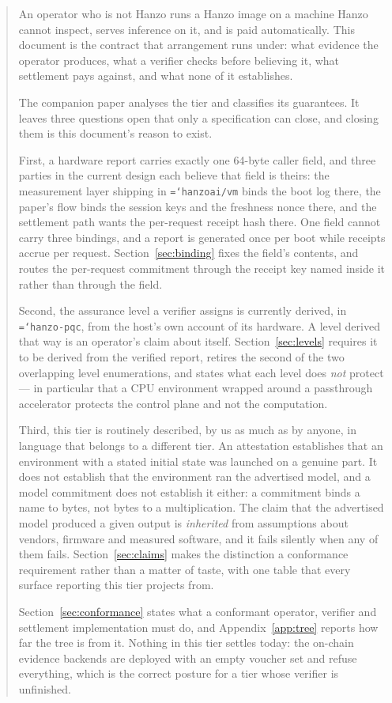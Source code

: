 \documentclass[11pt,a4paper]{article}
\newcommand{\code}[1]{\texttt{\hyphenchar\font=`\-\relax #1}}
\begin{document}
\begin{abstract}
\noindent
An operator who is not Hanzo runs a Hanzo image on a machine Hanzo cannot
inspect, serves inference on it, and is paid automatically. This document is the
contract that arrangement runs under: what evidence the operator produces, what a
verifier checks before believing it, what settlement pays against, and what none
of it establishes.

The companion paper \cite{paper} analyses the tier and classifies its guarantees.
It leaves three questions open that only a specification can close, and closing
them is this document's reason to exist.

First, a hardware report carries exactly one 64-byte caller field, and three
parties in the current design each believe that field is theirs: the measurement
layer shipping in \code{hanzoai/vm} binds the boot log there, the paper's flow
binds the session keys and the freshness nonce there, and the settlement path
wants the per-request receipt hash there. One field cannot carry three bindings,
and a report is generated once per boot while receipts accrue per request.
Section~\ref{sec:binding} fixes the field's contents, and routes the per-request
commitment through the receipt key named inside it rather than through the field.

Second, the assurance level a verifier assigns is currently derived, in
\code{hanzo-pqc}, from the host's own account of its hardware. A level derived
that way is an operator's claim about itself. Section~\ref{sec:levels} requires it
to be derived from the verified report, retires the second of the two overlapping
level enumerations, and states what each level does \emph{not} protect --- in
particular that a CPU environment wrapped around a passthrough accelerator
protects the control plane and not the computation.

Third, this tier is routinely described, by us as much as by anyone, in language
that belongs to a different tier. An attestation establishes that an environment
with a stated initial state was launched on a genuine part. It does not establish
that the environment ran the advertised model, and a model commitment does not
establish it either: a commitment binds a name to bytes, not bytes to a
multiplication. The claim that the advertised model produced a given output is
\emph{inherited} from assumptions about vendors, firmware and measured software,
and it fails silently when any of them fails. Section~\ref{sec:claims} makes the
distinction a conformance requirement rather than a matter of taste, with one
table that every surface reporting this tier projects from.

Section~\ref{sec:conformance} states what a conformant operator, verifier and
settlement implementation must do, and Appendix~\ref{app:tree} reports how far
the tree is from it. Nothing in this tier settles today: the on-chain evidence
backends are deployed with an empty voucher set and refuse everything, which is
the correct posture for a tier whose verifier is unfinished.
\end{abstract}
\end{document}
